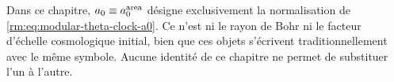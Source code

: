 \begin{remark}
Dans ce chapitre, \(a_0\equiv a_0^{\rm area}\) désigne exclusivement la
normalisation de \cref{rm:eq:modular-theta-clock-a0}. Ce n'est ni le rayon de Bohr
ni le facteur d'échelle cosmologique initial, bien que ces objets s'écrivent
traditionnellement avec le même symbole. Aucune identité de ce chapitre
ne permet de substituer l'un à l'autre.
\end{remark}
